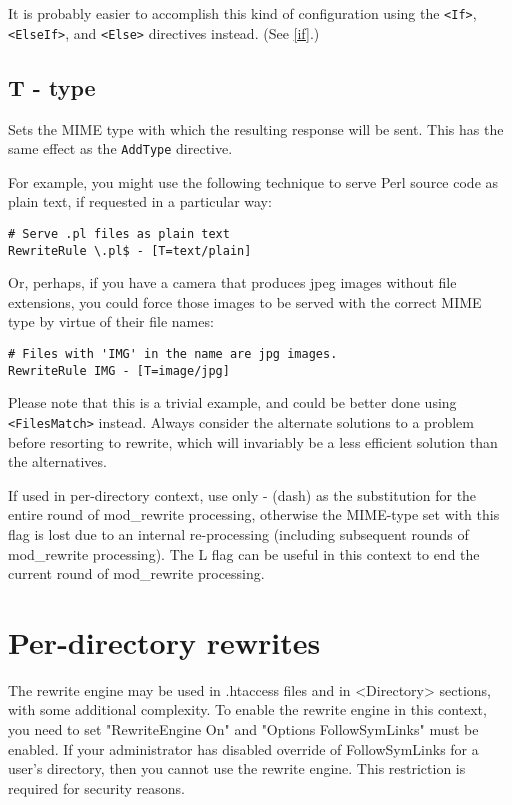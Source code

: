 It is probably easier to accomplish this kind of configuration using the \verb~<If>~, \verb~<ElseIf>~, and \verb~<Else>~ directives instead. (See \ref{if}.)

\subsection{T - type}
\label{tflag}

Sets the MIME type with which the resulting response will be sent. This has the same effect as the \verb~AddType~ directive.

For example, you might use the following technique to serve Perl source code as plain text, if requested in a particular way:

\begin{verbatim}
# Serve .pl files as plain text
RewriteRule \.pl$ - [T=text/plain]
\end{verbatim}

Or, perhaps, if you have a camera that produces jpeg images without file extensions, you could force those images to be served with the correct MIME type by virtue of their file names:

\begin{verbatim}
# Files with 'IMG' in the name are jpg images.
RewriteRule IMG - [T=image/jpg]
\end{verbatim}

Please note that this is a trivial example, and could be better done using \verb~<FilesMatch>~ instead. Always consider the alternate solutions to a problem before resorting to rewrite, which will invariably be a less efficient solution than the alternatives.

If used in per-directory context, use only - (dash) as the substitution for the entire round of mod\_rewrite processing, otherwise the MIME-type set with this flag is lost due to an internal re-processing (including subsequent rounds of mod\_rewrite processing). The L flag can be useful in this context to end the current round of mod\_rewrite processing.

\section{Per-directory rewrites}

The rewrite engine may be used in .htaccess files and in <Directory> sections, with some additional complexity.
To enable the rewrite engine in this context, you need to set "RewriteEngine On" and "Options FollowSymLinks" must be enabled. If your administrator has disabled override of FollowSymLinks for a user's directory, then you cannot use the rewrite engine. This restriction is required for security reasons.

